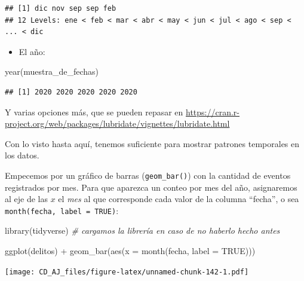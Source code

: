 \documentclass[
]{book}
\newenvironment{Shaded}{\begin{snugshade}}{\end{snugshade}}
\newcommand{\AttributeTok}[1]{\textcolor[rgb]{0.77,0.63,0.00}{#1}}
\newcommand{\CommentTok}[1]{\textcolor[rgb]{0.56,0.35,0.01}{\textit{#1}}}
\newcommand{\ConstantTok}[1]{\textcolor[rgb]{0.00,0.00,0.00}{#1}}
\newcommand{\FunctionTok}[1]{\textcolor[rgb]{0.00,0.00,0.00}{#1}}
\newcommand{\NormalTok}[1]{#1}
\newcommand{\SpecialCharTok}[1]{\textcolor[rgb]{0.00,0.00,0.00}{#1}}
\providecommand{\tightlist}{%
  \setlength{\itemsep}{0pt}\setlength{\parskip}{0pt}}
\begin{document}
\begin{verbatim}
## [1] dic nov sep sep feb
## 12 Levels: ene < feb < mar < abr < may < jun < jul < ago < sep < ... < dic
\end{verbatim}

\begin{itemize}
\tightlist
\item
  El año:
\end{itemize}

\begin{Shaded}
\begin{Highlighting}[]
\FunctionTok{year}\NormalTok{(muestra\_de\_fechas)}
\end{Highlighting}
\end{Shaded}

\begin{verbatim}
## [1] 2020 2020 2020 2020 2020
\end{verbatim}

Y varias opciones más, que se pueden repasar en \url{https://cran.r-project.org/web/packages/lubridate/vignettes/lubridate.html}

Con lo visto hasta aquí, tenemos suficiente para mostrar patrones temporales en los datos.

Empecemos por un gráfico de barras (\texttt{geom\_bar()}) con la cantidad de eventos registrados por mes. Para que aparezca un conteo por mes del año, asignaremos al eje de las \(x\) el \emph{mes} al que corresponde cada valor de la columna ``fecha'', o sea \texttt{month(fecha,\ label\ =\ TRUE)}:

\begin{Shaded}
\begin{Highlighting}[]
\FunctionTok{library}\NormalTok{(tidyverse) }\CommentTok{\# cargamos la librería en caso de no haberlo hecho antes}
\end{Highlighting}
\end{Shaded}

\begin{Shaded}
\begin{Highlighting}[]
\FunctionTok{ggplot}\NormalTok{(delitos) }\SpecialCharTok{+} 
    \FunctionTok{geom\_bar}\NormalTok{(}\FunctionTok{aes}\NormalTok{(}\AttributeTok{x =} \FunctionTok{month}\NormalTok{(fecha, }\AttributeTok{label =} \ConstantTok{TRUE}\NormalTok{)))}
\end{Highlighting}
\end{Shaded}

\texttt{[image: CD\_AJ\_files/figure-latex/unnamed-chunk-142-1.pdf]}
\end{document}
